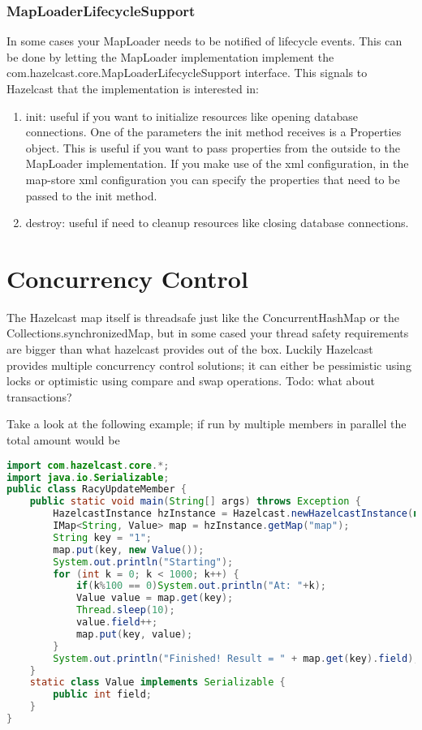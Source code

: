 \subsubsection*{MapLoaderLifecycleSupport}
In some cases your MapLoader needs to be notified of lifecycle events. This can be done by letting the MapLoader implementation implement the com.hazelcast.core.MapLoaderLifecycleSupport interface. This signals to Hazelcast that the implementation is interested in:
\begin{enumerate}
\item init: useful if you want to initialize resources like opening database connections. One of the parameters the init method receives is a Properties object. This is useful if you want to pass properties from the outside to the MapLoader implementation. If you make use of the xml configuration, in the map-store xml configuration you can specify the properties that need to be passed to the init method.
\item destroy: useful if need to cleanup resources like closing database connections.
\end{enumerate}

\section{Concurrency Control}
The Hazelcast map itself is threadsafe just like the ConcurrentHashMap or the Collections.synchronizedMap, but in some cased your thread safety requirements are bigger than what hazelcast provides out of the box. Luckily Hazelcast provides multiple concurrency control solutions;  it can either be pessimistic using locks or optimistic using compare and swap operations. Todo: what about transactions?

Take a look at the following example; if run by multiple members in parallel the total amount would be 
\begin{lstlisting}[language=java]
import com.hazelcast.core.*;
import java.io.Serializable;
public class RacyUpdateMember {
    public static void main(String[] args) throws Exception {
        HazelcastInstance hzInstance = Hazelcast.newHazelcastInstance(null);
        IMap<String, Value> map = hzInstance.getMap("map");
        String key = "1";
        map.put(key, new Value());
        System.out.println("Starting");
        for (int k = 0; k < 1000; k++) {
            if(k%100 == 0)System.out.println("At: "+k);
            Value value = map.get(key);
            Thread.sleep(10);
            value.field++;
            map.put(key, value);
        }
        System.out.println("Finished! Result = " + map.get(key).field);
    }
    static class Value implements Serializable {
        public int field;
    }
}
\end{lstlisting}

